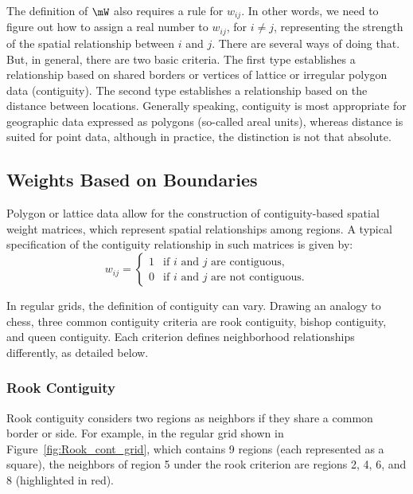 \documentclass[english,12pt]{book}\usepackage[]{graphicx}\usepackage[]{xcolor}
\begin{document}
The definition of $\mW$ also requires a rule for $w_{ij}$. In other words, we need to figure out how to assign a real number to $w_{ij}$, for $i\neq j$, representing the strength of the spatial relationship between $i$ and $j$. There are several ways of doing that. But, in general, there are two basic criteria. The first type establishes a relationship based on shared borders or vertices of lattice or irregular polygon data (contiguity). The second type establishes a relationship based on the distance between locations. Generally speaking, contiguity is most appropriate for geographic data expressed as polygons (so-called areal units), whereas distance is suited for point data, although in practice, the distinction is not that absolute. 

\subsection{Weights Based on Boundaries}

Polygon or lattice data allow for the construction of contiguity-based spatial weight matrices, which represent spatial relationships among regions. A typical specification of the contiguity relationship in such matrices is given by:
\begin{equation*}
  w_{ij}= 
   \begin{cases}
      1 & \mbox{if $i$ and $j$ are contiguous,} \\ 
      0 & \mbox{if $i$ and $j$ are not contiguous.} 
   \end{cases}
\end{equation*}

In regular grids, the definition of contiguity can vary. Drawing an analogy to chess, three common contiguity criteria are rook contiguity, bishop contiguity, and queen contiguity. Each criterion defines neighborhood relationships differently, as detailed below.

\subsubsection{Rook Contiguity}

Rook contiguity considers two regions as neighbors if they share a common border or side. For example, in the regular grid shown in Figure~\ref{fig:Rook_cont_grid}, which contains 9 regions (each represented as a square), the neighbors of region 5 under the rook criterion are regions 2, 4, 6, and 8 (highlighted in red).
\end{document}
